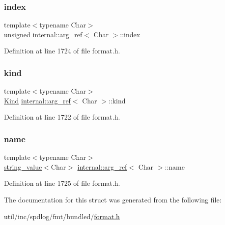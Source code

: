 \subsubsection{\texorpdfstring{index}{index}}
{\footnotesize\ttfamily template$<$typename Char$>$ \\
unsigned \hyperlink{structinternal_1_1arg__ref}{internal\+::arg\+\_\+ref}$<$ Char $>$\+::index}



Definition at line 1724 of file format.\+h.

\mbox{\label{structinternal_1_1arg__ref_a25436065015bb69cd626da81e10653f6}} 
\subsubsection{\texorpdfstring{kind}{kind}}
{\footnotesize\ttfamily template$<$typename Char$>$ \\
\hyperlink{structinternal_1_1arg__ref_a2d07deb839e942cac187aa85bdde30a3}{Kind} \hyperlink{structinternal_1_1arg__ref}{internal\+::arg\+\_\+ref}$<$ Char $>$\+::kind}



Definition at line 1722 of file format.\+h.

\mbox{\label{structinternal_1_1arg__ref_a65c8e4bff9fc8c99ca857d1be861702a}} 
\subsubsection{\texorpdfstring{name}{name}}
{\footnotesize\ttfamily template$<$typename Char$>$ \\
\hyperlink{structinternal_1_1string__value}{string\+\_\+value}$<$Char$>$ \hyperlink{structinternal_1_1arg__ref}{internal\+::arg\+\_\+ref}$<$ Char $>$\+::name}



Definition at line 1725 of file format.\+h.



The documentation for this struct was generated from the following file\+:\begin{DoxyCompactItemize}
\item 
util/inc/spdlog/fmt/bundled/\hyperlink{format_8h}{format.\+h}\end{DoxyCompactItemize}

